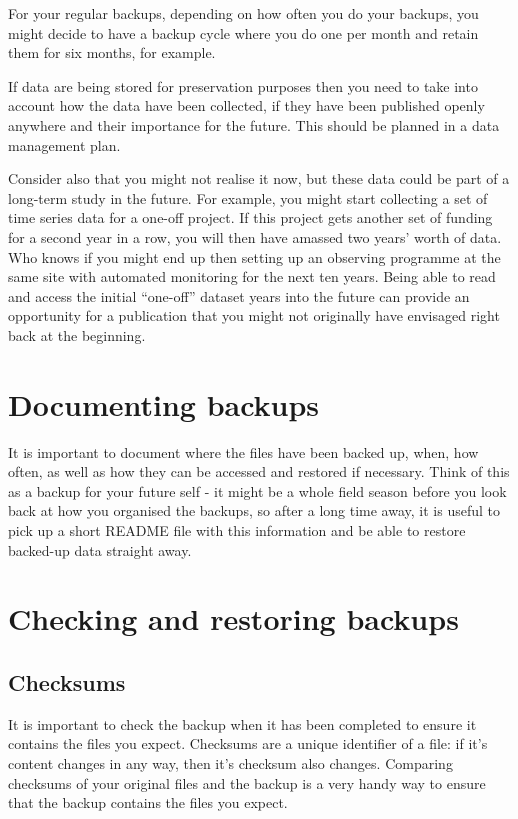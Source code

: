 \documentclass[a4paper,oneside]{report}
\begin{document}
For your regular backups, depending on how often you do your backups,
you might decide to have a backup cycle where you do one per month and
retain them for six months, for example.

If data are being stored for preservation purposes then you need to take
into account how the data have been collected, if they have been
published openly anywhere and their importance for the future. This
should be planned in a data management plan.

Consider also that you might not realise it now, but these data could be
part of a long-term study in the future. For example, you might start
collecting a set of time series data for a one-off project. If this
project gets another set of funding for a second year in a row, you will
then have amassed two years' worth of data. Who knows if you might end
up then setting up an observing programme at the same site with
automated monitoring for the next ten years. Being able to read and
access the initial ``one-off'' dataset years into the future can provide
an opportunity for a publication that you might not originally have
envisaged right back at the beginning.

\hypertarget{documenting-backups}{%
\section{Documenting backups}\label{documenting-backups}}

It is important to document where the files have been backed up, when,
how often, as well as how they can be accessed and restored if
necessary. Think of this as a backup for your future self - it might be
a whole field season before you look back at how you organised the
backups, so after a long time away, it is useful to pick up a short
README file with this information and be able to restore backed-up data
straight away.

\hypertarget{checking-and-restoring-backups}{%
\section{Checking and restoring
backups}\label{checking-and-restoring-backups}}

\hypertarget{checksums}{%
\subsection{Checksums}\label{checksums}}

It is important to check the backup when it has been completed to ensure
it contains the files you expect. Checksums are a unique identifier of a
file: if it's content changes in any way, then it's checksum also
changes. Comparing checksums of your original files and the backup is a
very handy way to ensure that the backup contains the files you expect.
\end{document}
